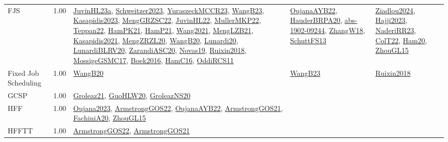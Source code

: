 {\begin{longtable}{p{3cm}r>{\raggedright\arraybackslash}p{6cm}>{\raggedright\arraybackslash}p{6cm}>{\raggedright\arraybackslash}p{8cm}}
\index{FJS}\index{Classification!FJS}FJS &  1.00 & \hyperref[detail:JuvinHL23a]{JuvinHL23a}, \hyperref[detail:Schweitzer2023]{Schweitzer2023}, \hyperref[detail:YuraszeckMCCR23]{YuraszeckMCCR23}, \hyperref[detail:WangB23]{WangB23}, \hyperref[detail:Kasapidis2023]{Kasapidis2023}, \hyperref[detail:MengGRZSC22]{MengGRZSC22}, \hyperref[detail:JuvinHL22]{JuvinHL22}, \hyperref[detail:MullerMKP22]{MullerMKP22}, \hyperref[detail:Teppan22]{Teppan22}, \hyperref[detail:HamPK21]{HamPK21}, \hyperref[detail:HamP21]{HamP21}, \hyperref[detail:Wang2021]{Wang2021}, \hyperref[detail:MengLZB21]{MengLZB21}, \hyperref[detail:Kasapidis2021]{Kasapidis2021}, \hyperref[detail:MengZRZL20]{MengZRZL20}, \hyperref[detail:WangB20]{WangB20}, \hyperref[detail:Lunardi20]{Lunardi20}, \hyperref[detail:LunardiBLRV20]{LunardiBLRV20}, \hyperref[detail:ZarandiASC20]{ZarandiASC20}, \hyperref[detail:Novas19]{Novas19}, \hyperref[detail:Ruixin2018]{Ruixin2018}, \hyperref[detail:MossigeGSMC17]{MossigeGSMC17}, \hyperref[detail:Boek2016]{Boek2016}, \hyperref[detail:HamC16]{HamC16}, \hyperref[detail:OddiRCS11]{OddiRCS11} & \hyperref[detail:OujanaAYB22]{OujanaAYB22}, \hyperref[detail:HauderBRPA20]{HauderBRPA20}, \hyperref[detail:abs-1902-09244]{abs-1902-09244}, \hyperref[detail:ZhangW18]{ZhangW18}, \hyperref[detail:SchuttFS13]{SchuttFS13} & \hyperref[detail:Ziadlou2024]{Ziadlou2024}, \hyperref[detail:Hajji2023]{Hajji2023}, \hyperref[detail:NaderiRR23]{NaderiRR23}, \hyperref[detail:ColT22]{ColT22}, \hyperref[detail:Ham20]{Ham20}, \hyperref[detail:ZhouGL15]{ZhouGL15}\\
\index{Fixed Job Scheduling}\index{Classification!Fixed Job Scheduling}Fixed Job Scheduling &  1.00 & \hyperref[detail:WangB20]{WangB20} & \hyperref[detail:WangB23]{WangB23} & \hyperref[detail:Ruixin2018]{Ruixin2018}\\
\index{GCSP}\index{Classification!GCSP}GCSP &  1.00 & \hyperref[detail:Groleaz21]{Groleaz21}, \hyperref[detail:GuoHLW20]{GuoHLW20}, \hyperref[detail:GroleazNS20]{GroleazNS20} &  & \\
\index{HFF}\index{Classification!HFF}HFF &  1.00 & \hyperref[detail:Oujana2023]{Oujana2023}, \hyperref[detail:ArmstrongGOS22]{ArmstrongGOS22}, \hyperref[detail:OujanaAYB22]{OujanaAYB22}, \hyperref[detail:ArmstrongGOS21]{ArmstrongGOS21}, \hyperref[detail:FachiniA20]{FachiniA20}, \hyperref[detail:ZhouGL15]{ZhouGL15} &  & \\
\index{HFFTT}\index{Classification!HFFTT}HFFTT &  1.00 & \hyperref[detail:ArmstrongGOS22]{ArmstrongGOS22}, \hyperref[detail:ArmstrongGOS21]{ArmstrongGOS21} &  & \\

\end{longtable}}
